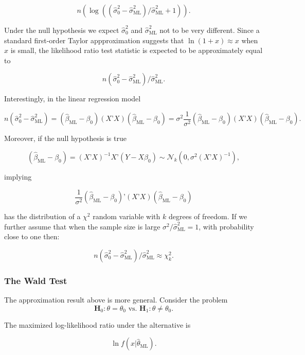 \documentclass[11pt]{article} %
\begin{document}
\[n  \left( \log \left(  (\widehat{\sigma}^2_{0} - \widehat{\sigma}^2_{\textrm{ML}})/\widehat{\sigma}^2_{\textrm{ML}} +1  \right) \right). \]

\noindent Under the null hypothesis we expect $\widehat{\sigma}^2_0$ and $\widehat{\sigma}^2_{\textrm{ML}}$ not to be very different. Since a standard first-order Taylor appproximation suggests that $\ln(1+x) \approx x$ when $x$ is small, the likelihood ratio test statistic is expected to be approximately equal to 

\[ n(\widehat{\sigma}^2_{0} - \widehat{\sigma}^2_{\textrm{ML}})/\widehat{\sigma}^2_{\textrm{ML}}.\]

\noindent Interestingly, in the linear regression model 

\[n(\widehat{\sigma}^2_{0} - \widehat{\sigma}^2_{\textrm{ML}}) = (\widehat{\beta}_{\textrm{ML}} - \beta_0 ) (X’X)  (\widehat{\beta}_{\textrm{ML}} - \beta_0 )  = \sigma^2 \frac{1}{\sigma^2} (\widehat{\beta}_{\textrm{ML}} - \beta_0 ) (X’X)  (\widehat{\beta}_{\textrm{ML}} - \beta_0 ).  \]

\noindent Moreover, if the null hypothesis is true

\[(\widehat{\beta}_{\textrm{ML}} - \beta_0 ) = (X’X)^{-1} X’(Y - X \beta_0) \sim \mathcal{N}_k(0, \sigma^2 (X’X)^{-1}),\]

\noindent implying 

\[\frac{1}{\sigma^2} (\widehat{\beta}_{\textrm{ML}} - \beta_0 )’ (X’X)  (\widehat{\beta}_{\textrm{ML}} - \beta_0 ) \]

\noindent has the distribution of a $\chi^2$ random variable with $k$ degrees of freedom. If we further assume that when the sample size is large $\sigma^2 / \widehat{\sigma}^2_{\textrm{ML}}=1$, with probability close to one then:

\[ n(\widehat{\sigma}^2_{0} - \widehat{\sigma}^2_{\textrm{ML}})/\widehat{\sigma}^2_{\textrm{ML}} \approx \chi^2_{k}.\]

\subsubsection{The Wald Test}

The approximation result above is more general. Consider the problem
\[\textbf{H}_0: \theta=\theta_0 \textrm{ vs. }  \textbf{H}_1: \theta \neq \theta_0. \]

\noindent The maximized log-likelihood ratio under the alternative is

\[ \ln f( x | \widehat{\theta}_{\textrm{ML}}).\]
\end{document}
